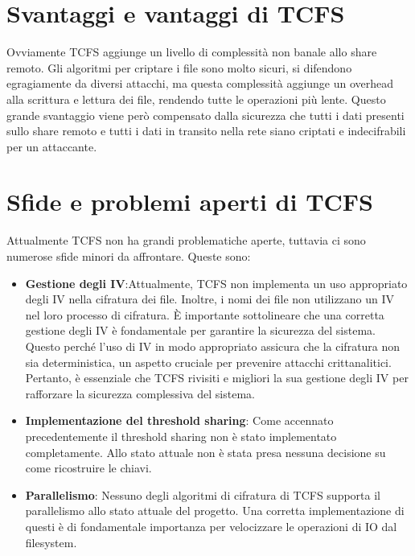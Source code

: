 \section{Svantaggi e vantaggi di TCFS} %
Ovviamente TCFS aggiunge un livello di complessità non banale allo share remoto. Gli algoritmi per criptare i file sono molto sicuri, si difendono egragiamente da diversi attacchi, ma questa complessità aggiunge un overhead alla scrittura e lettura dei file, rendendo tutte le operazioni più lente. Questo grande svantaggio viene però compensato dalla sicurezza che tutti i dati presenti sullo share remoto e tutti i dati in transito nella rete siano criptati e indecifrabili per un attaccante.


\section{Sfide e problemi aperti di TCFS} %
Attualmente TCFS non ha grandi problematiche aperte, tuttavia ci sono numerose sfide minori da affrontare. Queste sono:
\begin{itemize}
    \item \textbf{Gestione degli IV}:Attualmente, TCFS non implementa un uso appropriato degli IV nella cifratura dei file. Inoltre, i nomi dei file non utilizzano un IV nel loro processo di cifratura. È importante sottolineare che una corretta gestione degli IV è fondamentale per garantire la sicurezza del sistema. Questo perché l’uso di IV in modo appropriato assicura che la cifratura non sia deterministica, un aspetto cruciale per prevenire attacchi crittanalitici. Pertanto, è essenziale che TCFS rivisiti e migliori la sua gestione degli IV per rafforzare la sicurezza complessiva del sistema.
    \item \textbf{Implementazione del threshold sharing}: Come accennato precedentemente il threshold sharing non è stato implementato completamente. Allo stato attuale non è stata presa nessuna decisione su come ricostruire le chiavi.
    \item \textbf{Parallelismo}: Nessuno degli algoritmi di cifratura di TCFS supporta il parallelismo allo stato attuale del progetto. Una corretta implementazione di questi è di fondamentale importanza per velocizzare le operazioni di IO dal filesystem.
\end{itemize}

